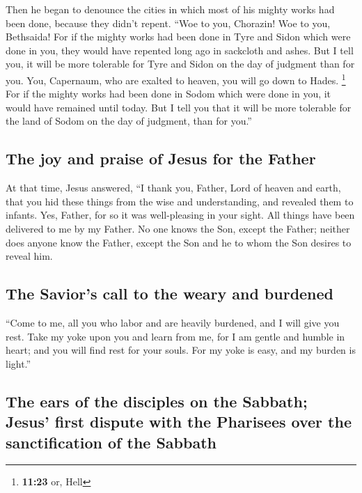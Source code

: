 Then he began to denounce the cities in which most of
his mighty works had been done, because they didn't repent.
 ``Woe to you, Chorazin! Woe to you, Bethsaida! For if
the mighty works had been done in Tyre and Sidon which were done in you,
they would have repented long ago in sackcloth and ashes.
 But I tell you, it will be more tolerable for Tyre and
Sidon on the day of judgment than for you.  You,
Capernaum, who are exalted to heaven, you will go down to Hades.
\footnote{\textbf{11:23} or, Hell} For if the mighty works had been done
in Sodom which were done in you, it would have remained until today.
 But I tell you that it will be more tolerable for the
land of Sodom on the day of judgment, than for you.''

\hypertarget{the-joy-and-praise-of-jesus-for-the-father}{%
\subsection{The joy and praise of Jesus for the
Father}\label{the-joy-and-praise-of-jesus-for-the-father}}

 At that time, Jesus answered, ``I thank you, Father,
Lord of heaven and earth, that you hid these things from the wise and
understanding, and revealed them to infants.  Yes,
Father, for so it was well-pleasing in your sight.  All
things have been delivered to me by my Father. No one knows the Son,
except the Father; neither does anyone know the Father, except the Son
and he to whom the Son desires to reveal him.

\hypertarget{the-saviors-call-to-the-weary-and-burdened}{%
\subsection{The Savior's call to the weary and
burdened}\label{the-saviors-call-to-the-weary-and-burdened}}

 ``Come to me, all you who labor and are heavily
burdened, and I will give you rest.  Take my yoke upon
you and learn from me, for I am gentle and humble in heart; and you will
find rest for your souls.  For my yoke is easy, and my
burden is light.''

\hypertarget{the-ears-of-the-disciples-on-the-sabbath-jesus-first-dispute-with-the-pharisees-over-the-sanctification-of-the-sabbath}{%
\subsection{The ears of the disciples on the Sabbath; Jesus' first
dispute with the Pharisees over the sanctification of the
Sabbath}\label{the-ears-of-the-disciples-on-the-sabbath-jesus-first-dispute-with-the-pharisees-over-the-sanctification-of-the-sabbath}}

